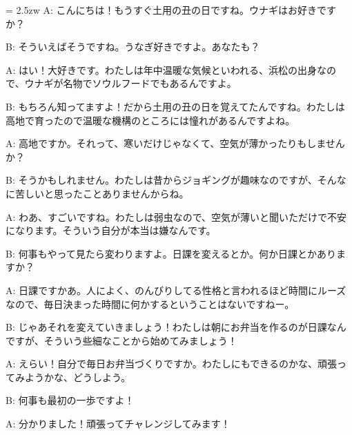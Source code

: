 \documentclass[11pt]{amsart}
\title{}
\author{}
\newenvironment{hangall}[1]{\hangindent = 2.5zw\everypar{\hangindent = 2.5zw}}{}
\begin{document}
\maketitle
\begin{hangall}{}%
A: こんにちは！もうすぐ土用の丑の日ですね。ウナギはお好きですか？

B: そういえばそうですね。うなぎ好きですよ。あなたも？

A: はい！大好きです。わたしは年中温暖な気候といわれる、浜松の出身なので、ウナギが名物でソウルフードでもあるんですよ。

B: もちろん知ってますよ！だから土用の丑の日を覚えてたんですね。わたしは高地で育ったので温暖な機構のところには憧れがあるんですよね。

A: 高地ですか。それって、寒いだけじゃなくて、空気が薄かったりもしませんか？

B: そうかもしれません。わたしは昔からジョギングが趣味なのですが、そんなに苦しいと思ったことありませんからね。

A: わあ、すごいですね。わたしは弱虫なので、空気が薄いと聞いただけで不安になります。そういう自分が本当は嫌なんです。

B: 何事もやって見たら変わりますよ。日課を変えるとか。何か日課とかありますか？

A: 日課ですかあ。人によく、のんびりしてる性格と言われるほど時間にルーズなので、毎日決まった時間に何かするということはないですねー。

B: じゃあそれを変えていきましょう！わたしは朝にお弁当を作るのが日課なんですが、そういう些細なことから始めてみましょう！

A: えらい！自分で毎日お弁当づくりですか。わたしにもできるのかな、頑張ってみようかな、どうしよう。

B: 何事も最初の一歩ですよ！

A: 分かりました！頑張ってチャレンジしてみます！
\end{hangall}
\end{document}
